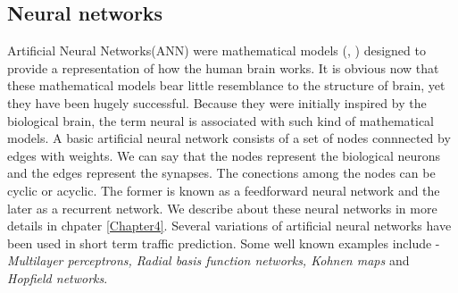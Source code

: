 \subsection{Neural networks}
\label{subsec:neuralNetworksTrafficPred}
Artificial Neural Networks(ANN) were mathematical models (\citet{mcculloch1943logical},
\citet{rosenblatt1958perceptron}) designed to  provide a representation of how the human brain
works. It is obvious now that these mathematical models bear little resemblance to the structure
of brain, yet they have been hugely successful. Because they were initially inspired by the
biological brain, the term neural is associated with such kind of mathematical models. A basic
artificial neural network consists of a set of nodes connnected by edges with weights. We can say
that the nodes represent the biological neurons and the edges represent the synapses. The
conections among the nodes can be cyclic or acyclic. The former is known as a feedforward neural
network and the later as a recurrent network. We describe about these neural networks in more
details in chpater \ref{Chapter4}. Several variations of artificial neural networks have been
used in short term traffic prediction. Some well known examples include - \textit{Multilayer
perceptrons, Radial basis function networks, Kohnen maps} and \textit{Hopfield networks}.

